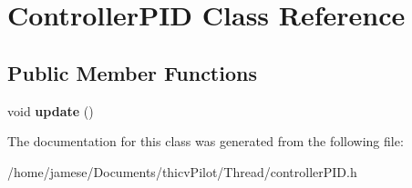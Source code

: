 \hypertarget{class_controller_p_i_d}{}\section{Controller\+P\+ID Class Reference}
\label{class_controller_p_i_d}
\subsection*{Public Member Functions}
\begin{DoxyCompactItemize}
\item 
\mbox{\label{class_controller_p_i_d_a46c3886a56182eb30617d129ddd4e186}} 
void {\bfseries update} ()
\end{DoxyCompactItemize}


The documentation for this class was generated from the following file\+:\begin{DoxyCompactItemize}
\item 
/home/jamese/\+Documents/thicv\+Pilot/\+Thread/controller\+P\+I\+D.\+h\end{DoxyCompactItemize}
